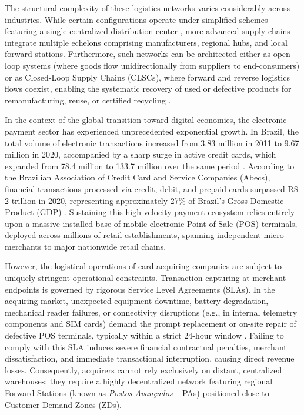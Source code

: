 \documentclass[preprint,12pt,authoryear]{elsarticle}
\begin{document}
The structural complexity of these logistics networks varies considerably across industries. While certain configurations operate under simplified schemes featuring a single centralized distribution center \citep{SINGH2018343}, more advanced supply chains integrate multiple echelons comprising manufacturers, regional hubs, and local forward stations. Furthermore, such networks can be architected either as open-loop systems (where goods flow unidirectionally from suppliers to end-consumers) or as Closed-Loop Supply Chains (CLSCs), where forward and reverse logistics flows coexist, enabling the systematic recovery of used or defective products for remanufacturing, reuse, or certified recycling \citep{AMIN2017316}.

In the context of the global transition toward digital economies, the electronic payment sector has experienced unprecedented exponential growth. In Brazil, the total volume of electronic transactions increased from 3.83 million in 2011 to 9.67 million in 2020, accompanied by a sharp surge in active credit cards, which expanded from 78.4 million to 133.7 million over the same period \citep{TNS}. According to the Brazilian Association of Credit Card and Service Companies (Abecs), financial transactions processed via credit, debit, and prepaid cards surpassed R\$ 2 trillion in 2020, representing approximately 27\% of Brazil's Gross Domestic Product (GDP) \citep{Valenti1998}. Sustaining this high-velocity payment ecosystem relies entirely upon a massive installed base of mobile electronic Point of Sale (POS) terminals, deployed across millions of retail establishments, spanning independent micro-merchants to major nationwide retail chains.

However, the logistical operations of card acquiring companies are subject to uniquely stringent operational constraints. Transaction capturing at merchant endpoints is governed by rigorous Service Level Agreements (SLAs). In the acquiring market, unexpected equipment downtime, battery degradation, mechanical reader failures, or connectivity disruptions (e.g., in internal telemetry components and SIM cards) demand the prompt replacement or on-site repair of defective POS terminals, typically within a strict 24-hour window \citep{Silva2021Adquirencia}. Failing to comply with this SLA induces severe financial contractual penalties, merchant dissatisfaction, and immediate transactional interruption, causing direct revenue losses. Consequently, acquirers cannot rely exclusively on distant, centralized warehouses; they require a highly decentralized network featuring regional Forward Stations (known as \emph{Postos Avan\c{c}ados} -- PAs) positioned close to Customer Demand Zones (ZDs).
\end{document}
